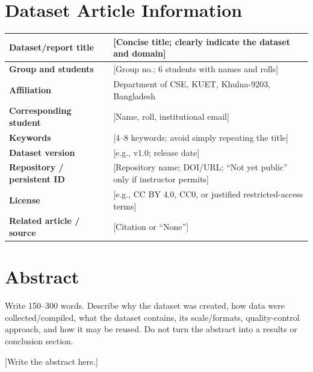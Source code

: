 \documentclass[11pt,a4paper]{article}
\begin{document}
\section{Dataset Article Information}
\noindent
\begin{tabularx}{\textwidth}{|p{4.2cm}|X|}
\hline
\textbf{Dataset/report title} & [Concise title; clearly indicate the dataset and domain] \\
\hline
\textbf{Group and students} & [Group no.; 6 students with names and rolls] \\
\hline
\textbf{Affiliation} & Department of CSE, KUET, Khulna-9203, Bangladesh \\
\hline
\textbf{Corresponding student} & [Name, roll, institutional email] \\
\hline
\textbf{Keywords} & [4–8 keywords; avoid simply repeating the title] \\
\hline
\textbf{Dataset version} & [e.g., v1.0; release date] \\
\hline
\textbf{Repository / persistent ID} & [Repository name; DOI/URL; “Not yet public” only if instructor permits] \\
\hline
\textbf{License} & [e.g., CC BY 4.0, CC0, or justified restricted-access terms] \\
\hline
\textbf{Related article / source} & [Citation or “None”] \\
\hline
\end{tabularx}

\vspace{1.5em}

\section{Abstract}
Write 150–300 words. Describe why the dataset was created, how data were collected/compiled, what the dataset contains, its scale/formats, quality-control approach, and how it may be reused. Do not turn the abstract into a results or conclusion section.

[Write the abstract here.]

\vspace{1.5em}

\end{document}

